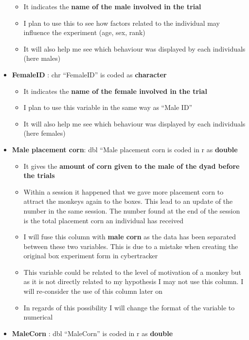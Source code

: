 \documentclass[
]{article}
\providecommand{\tightlist}{%
  \setlength{\itemsep}{0pt}\setlength{\parskip}{0pt}}
\begin{document}
\begin{itemize}
  \begin{itemize}
  \tightlist
  \item
    It indicates the \textbf{name of the male involved in the trial}
  \item
    I plan to use this to see how factors related to the individual may
    influence the experiment (age, sex, rank)
  \item
    It will also help me see which behaviour was displayed by each
    individuals (here males)
  \end{itemize}
\item
  \textbf{FemaleID} : chr ``FemaleID'' is coded as \textbf{character}

  \begin{itemize}
  \tightlist
  \item
    It indicates the \textbf{name of the female involved in the trial}
  \item
    I plan to use this variable in the same way as ``Male ID''
  \item
    It will also help me see which behaviour was displayed by each
    individuals (here females)
  \end{itemize}
\item
  \textbf{Male placement corn}: dbl ``Male placement corn is coded in r
  as \textbf{double}

  \begin{itemize}
  \item
    It gives the \textbf{amount of corn given to the male of the dyad
    before the trials}
  \item
    Within a session it happened that we gave more placement corn to
    attract the monkeys again to the boxes. This lead to an update of
    the number in the same session. The number found at the end of the
    session is the total placement corn an individual has received
  \item
    I will fuse this column with \textbf{male corn} as the data has been
    separated between these two variables. This is due to a mistake when
    creating the original box experiment form in cybertracker
  \item
    This variable could be related to the level of motivation of a
    monkey but as it is not directly related to my hypothesis I may not
    use this column. I will re-consider the use of this column later on
  \item
    In regards of this possibility I will change the format of the
    variable to numerical
  \end{itemize}
\item
  \textbf{MaleCorn} : dbl ``MaleCorn'' is coded in r as \textbf{double}


\end{itemize}
\end{document}
